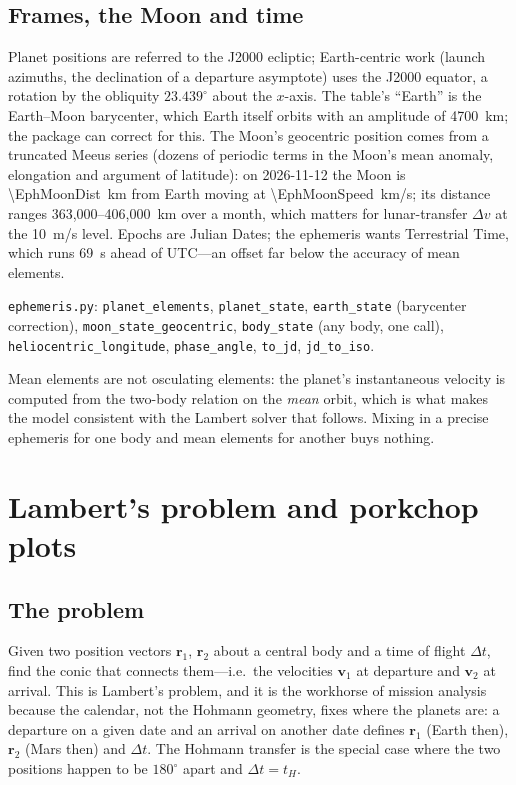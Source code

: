 \documentclass[11pt,letterpaper,oneside]{report}
\newcommand{\dv}{\Delta v}
\newcommand{\code}[1]{\texttt{#1}}
\newcommand{\bv}[1]{\bm{#1}}
\begin{document}
\section{Frames, the Moon and time}
Planet positions are referred to the J2000 ecliptic; Earth-centric work (launch azimuths, the
declination of a departure asymptote) uses the J2000 equator, a rotation by the obliquity
$23.439^\circ$ about the $x$-axis. The table's ``Earth'' is the Earth--Moon barycenter, which
Earth itself orbits with an amplitude of \SI{4700}{km}; the package can correct for this. The
Moon's geocentric position comes from a truncated Meeus series (dozens of periodic terms in the
Moon's mean anomaly, elongation and argument of latitude): on 2026-11-12 the Moon is
\SI{\EphMoonDist}{km} from Earth moving at \SI{\EphMoonSpeed}{km/s}; its distance ranges
363,000--406,000~km over a month, which matters for lunar-transfer $\dv$ at the \SI{10}{m/s}
level. Epochs are Julian Dates; the ephemeris wants Terrestrial Time, which runs \SI{69}{s} ahead
of UTC---an offset far below the accuracy of mean elements.

\begin{codebox}
\code{ephemeris.py}: \code{planet\_elements}, \code{planet\_state}, \code{earth\_state}
(barycenter correction), \code{moon\_state\_geocentric}, \code{body\_state} (any body, one call),
\code{heliocentric\_longitude}, \code{phase\_angle}, \code{to\_jd}, \code{jd\_to\_iso}.
\end{codebox}

\begin{pitfall}
Mean elements are not osculating elements: the planet's instantaneous velocity is computed from
the two-body relation on the \emph{mean} orbit, which is what makes the model consistent with the
Lambert solver that follows. Mixing in a precise ephemeris for one body and mean elements for
another buys nothing.
\end{pitfall}

\chapter{Lambert's problem and porkchop plots}\label{ch:lambert}

\section{The problem}
Given two position vectors $\bv r_1$, $\bv r_2$ about a central body and a time of flight
$\Delta t$, find the conic that connects them---i.e.\ the velocities $\bv v_1$ at departure and
$\bv v_2$ at arrival. This is Lambert's problem, and it is the workhorse of mission analysis
because the calendar, not the Hohmann geometry, fixes where the planets are: a departure on a
given date and an arrival on another date defines $\bv r_1$ (Earth then), $\bv r_2$ (Mars then)
and $\Delta t$. The Hohmann transfer is the special case where the two positions happen to be
$180^\circ$ apart and $\Delta t=t_H$.
\end{document}
